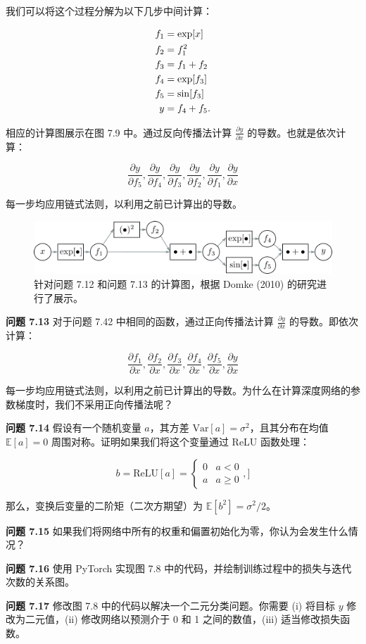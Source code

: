 我们可以将这个过程分解为以下几步中间计算：

\begin{align}
f_1 &= \exp[x] \notag \\
f_2 &= f_1^2 \notag \\
f_3 &= f_1 + f_2 \notag \\
f_4 &= \exp[f_3] \notag \\
f_5 &= \sin[f_3] \notag \\
y &= f_4 + f_5.
\end{align} 


相应的计算图展示在图 7.9 中。通过反向传播法计算 \(\frac{\partial y}{\partial x}\) 的导数。也就是依次计算：

\begin{equation}
\frac{\partial y}{\partial f_5}, \frac{\partial y}{\partial f_4}, \frac{\partial y}{\partial f_3}, \frac{\partial y}{\partial f_2}, \frac{\partial y}{\partial f_1}, \frac{\partial y}{\partial x} 
\end{equation}

每一步均应用链式法则，以利用之前已计算出的导数。

\begin{figure}[ht!]
\centering
\includegraphics[width=0.7\linewidth]{png/chapter7/Train2CompGraph.png}
\caption{针对问题 7.12 和问题 7.13 的计算图，根据 Domke (2010) 的研究进行了展示。}
\end{figure}

\textbf{问题 7.13} 对于问题 7.42 中相同的函数，通过正向传播法计算 \(\frac{\partial y}{\partial x}\) 的导数。即依次计算：

\begin{equation}
\frac{\partial f_1}{\partial x}, \frac{\partial f_2}{\partial x}, \frac{\partial f_3}{\partial x}, \frac{\partial f_4}{\partial x}, \frac{\partial f_5}{\partial x}, \frac{\partial y}{\partial x} 
\end{equation}

每一步均应用链式法则，以利用之前已计算出的导数。为什么在计算深度网络的参数梯度时，我们不采用正向传播法呢？

\textbf{问题 7.14} 假设有一个随机变量 \(a\)，其方差 \(\text{Var}[a] = \sigma^2\)，且其分布在均值 \(\mathbb{E}[a] = 0\) 周围对称。证明如果我们将这个变量通过 ReLU 函数处理：

\begin{equation}
b = \text{ReLU}[a] = \begin{cases}
0 & a < 0 \\
a & a \geq 0
\end{cases}, ]
\end{equation}

那么，变换后变量的二阶矩（二次方期望）为 \(\mathbb{E}[b^2] = \sigma^2/2\)。

\textbf{问题 7.15} 如果我们将网络中所有的权重和偏置初始化为零，你认为会发生什么情况？

\textbf{问题 7.16} 使用 PyTorch 实现图 7.8 中的代码，并绘制训练过程中的损失与迭代次数的关系图。

\textbf{问题 7.17} 修改图 7.8 中的代码以解决一个二元分类问题。你需要 (i) 将目标 \(y\) 修改为二元值，(ii) 修改网络以预测介于 0 和 1 之间的数值，(iii) 适当修改损失函数。

